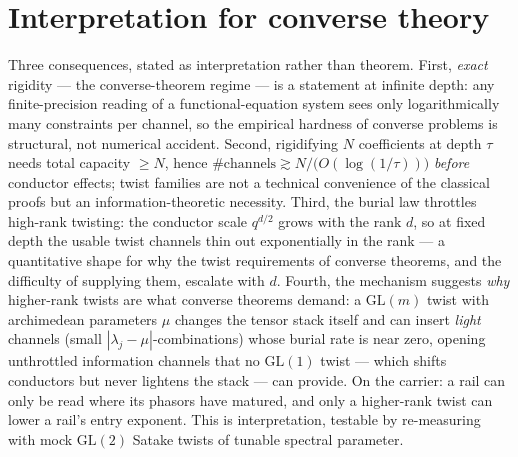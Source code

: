 \documentclass[11pt]{article}
\theoremstyle{definition}
\theoremstyle{remark}
\begin{document}
\section{Interpretation for converse theory}\label{sec:interp}

Three consequences, stated as interpretation rather than theorem.  First,
\emph{exact} rigidity --- the converse-theorem regime --- is a statement at
infinite depth: any finite-precision reading of a functional-equation
system sees only logarithmically many constraints per channel, so the
empirical hardness of converse problems is structural, not numerical
accident.  Second, rigidifying $N$ coefficients at depth $\tau$ needs
total capacity $\ge N$, hence
$\#\text{channels}\gtrsim N/\bigl(O(\log(1/\tau))\bigr)$ \emph{before}
conductor effects; twist families are not a technical convenience of the
classical proofs but an information-theoretic necessity.  Third, the burial
law throttles high-rank twisting: the conductor scale $q^{d/2}$ grows with
the rank $d$, so at fixed depth the usable twist channels thin out
exponentially in the rank --- a quantitative shape for why the twist
requirements of converse theorems, and the difficulty of supplying them,
escalate with $d$.  Fourth, the mechanism suggests \emph{why} higher-rank
twists are what converse theorems demand: a $\mathrm{GL}(m)$ twist with
archimedean parameters $\mu$ changes the tensor stack itself and can insert
\emph{light} channels (small $|\lambda_j-\mu|$-combinations) whose burial
rate is near zero, opening unthrottled information channels that no
$\mathrm{GL}(1)$ twist --- which shifts conductors but never lightens the
stack --- can provide.  On the carrier: a rail can only be read where its
phasors have matured, and only a higher-rank twist can lower a rail's entry
exponent.  This is interpretation, testable by re-measuring with mock
$\mathrm{GL}(2)$ Satake twists of tunable spectral parameter.
\end{document}
